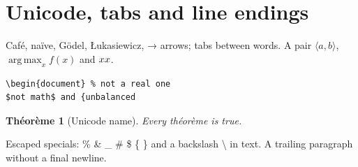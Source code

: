 ﻿\documentclass{article}
\newtheorem{thm}{Théorème}
\def\pair#1#2{\langle #1, #2\rangle}
\DeclareMathOperator*{\argmax}{arg\,max}
\begin{document}
\section{Unicode, tabs and line endings}
Café, naïve, Gödel, Łukasiewicz, → arrows; tabs	between	words.
A pair $\pair{a}{b}$, $\argmax_x f(x)$ and $xx$.

\begin{comment}
Also hidden: $x and }{ braces.
\end{comment}

\begin{verbatim}
\begin{document} % not a real one
$not math$ and {unbalanced
\end{verbatim}

\begin{thm}[Unicode name]
Every théorème is true.
\end{thm}

Escaped specials: \% \& \_ \# \$ \{ \} and a backslash \textbackslash{} in text.
A trailing paragraph without a final newline.
\end{document}
